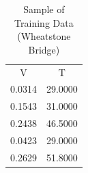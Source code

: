 \begin{table}[H]
\centering
\caption{Sample of Training Data (Wheatstone Bridge)}
\label{table:wheatstone_training_table}
\begin{tabular}{cc}

     V &       T \\

0.0314 & 29.0000 \\
0.1543 & 31.0000 \\
0.2438 & 46.5000 \\
0.0423 & 29.0000 \\
0.2629 & 51.8000 \\

\end{tabular}
\end{table}

